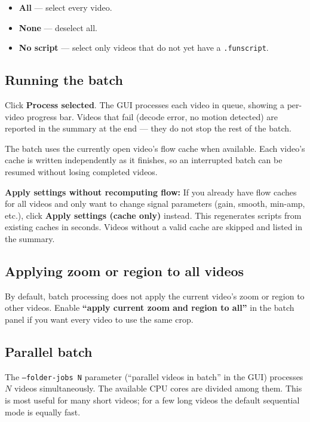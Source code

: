 \documentclass[11pt,a4paper]{article}
\newcommand{\code}[1]{\texttt{#1}}
\begin{document}
\begin{itemize}[noitemsep]
  \item \textbf{All} --- select every video.
  \item \textbf{None} --- deselect all.
  \item \textbf{No script} --- select only videos that do not yet have a \code{.funscript}.
\end{itemize}

\subsection{Running the batch}

Click \textbf{Process selected}. The GUI processes each video in queue, showing a per-video progress bar. Videos that fail (decode error, no motion detected) are reported in the summary at the end --- they do not stop the rest of the batch.

The batch uses the currently open video's flow cache when available. Each video's cache is written independently as it finishes, so an interrupted batch can be resumed without losing completed videos.

\begin{tipbox}
\textbf{Apply settings without recomputing flow:} If you already have flow caches for all videos and only want to change signal parameters (gain, smooth, min-amp, etc.), click \textbf{Apply settings (cache only)} instead. This regenerates scripts from existing caches in seconds. Videos without a valid cache are skipped and listed in the summary.
\end{tipbox}

\subsection{Applying zoom or region to all videos}

By default, batch processing does not apply the current video's zoom or region to other videos. Enable \textbf{``apply current zoom and region to all''} in the batch panel if you want every video to use the same crop.

\subsection{Parallel batch}

The \code{--folder-jobs N} parameter (``parallel videos in batch'' in the GUI) processes $N$ videos simultaneously. The available CPU cores are divided among them. This is most useful for many short videos; for a few long videos the default sequential mode is equally fast.
\end{document}
